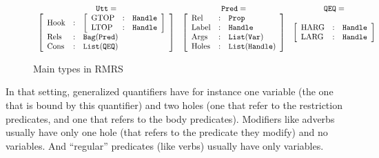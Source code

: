 \documentclass[11pt]{article}
\begin{document}
				\begin{figure}[h]
					\begin{equation*}
						\centering
						\begin{array}{ccc}
						\texttt{Utt} = & \texttt{Pred} = & \texttt{QEQ} = \\
						\left[
						\begin{array}{l l l}
						\mbox{Hook} &:& \left[
						\begin{array}{l l l}
						\mbox{GTOP} &:& \texttt{Handle}\\
						\mbox{LTOP} &:& \texttt{Handle}\\
						\end{array}
						\right]\\
						\mbox{Rels} &:& \texttt{Bag}(\texttt{Pred})\\
						\mbox{Cons} &:& \texttt{List}(\texttt{QEQ})\\
						\end{array}
						\right]
						&
						\left[
						\begin{array}{lll}
						\mbox{Rel} &:& \texttt{Prop}\\
						\mbox{Label} &:& \texttt{Handle} \\
						\mbox{Args} &:& \texttt{List}(\texttt{Var}) \\
						\mbox{Holes} &:& \texttt{List}(\texttt{Handle}) \\
						\end{array}
						\right]
						&
						\left[
						\begin{array}{lll}
						\mbox{HARG} &:& \texttt{Handle}\\
						\mbox{LARG} &:& \texttt{Handle}
						\end{array}
						\right]\\
						\end{array}
						\label{mrs_record}
					\end{equation*}
					\caption{Main types in RMRS}
					\label{fig:mrs_types}
				\end{figure}
				
				
				In that setting, generalized quantifiers have for instance one variable (the one that is bound by this quantifier) and two holes (one that refer to the restriction predicates, and one that refers to the body predicates). Modifiers like adverbs usually have only one hole (that refers to the predicate they modify) and no variables. And ``regular'' predicates (like verbs) usually have only variables.\\
				
\end{document}
